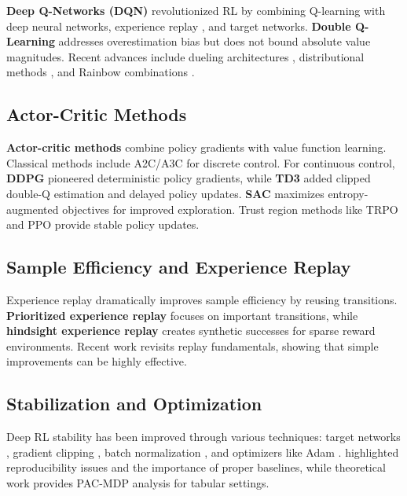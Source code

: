 \documentclass[11pt]{article}
\theoremstyle{definition}
\theoremstyle{remark}
\begin{document}
\textbf{Deep Q-Networks (DQN)} \citep{mnih2013playing, mnih2015human} revolutionized RL by combining Q-learning with deep neural networks, experience replay \citep{lin1992self}, and target networks. \textbf{Double Q-Learning} \citep{van2016deep} addresses overestimation bias but does not bound absolute value magnitudes. Recent advances include dueling architectures \citep{wang2016dueling}, distributional methods \citep{bellemare2017distributional, dabney2018implicit}, and Rainbow combinations \citep{hessel2018rainbow}.

\subsection{Actor-Critic Methods}

\textbf{Actor-critic methods} \citep{konda2000actor} combine policy gradients \citep{sutton2000policy} with value function learning. Classical methods include A2C/A3C \citep{mnih2016asynchronous} for discrete control. For continuous control, \textbf{DDPG} \citep{lillicrap2015continuous} pioneered deterministic policy gradients, while \textbf{TD3} \citep{fujimoto2018addressing} added clipped double-Q estimation and delayed policy updates. \textbf{SAC} \citep{haarnoja2018soft, haarnoja2018soft2} maximizes entropy-augmented objectives for improved exploration. Trust region methods like TRPO \citep{schulman2015trust} and PPO \citep{schulman2017proximal} provide stable policy updates.

\subsection{Sample Efficiency and Experience Replay}

Experience replay \citep{lin1992self} dramatically improves sample efficiency by reusing transitions. \textbf{Prioritized experience replay} \citep{schaul2015prioritized} focuses on important transitions, while \textbf{hindsight experience replay} \citep{andrychowicz2017hindsight} creates synthetic successes for sparse reward environments. Recent work \citep{fedus2020revisiting} revisits replay fundamentals, showing that simple improvements can be highly effective.

\subsection{Stabilization and Optimization}

Deep RL stability has been improved through various techniques: target networks \citep{mnih2015human}, gradient clipping \citep{pascanu2013difficulty}, batch normalization \citep{ioffe2015batch}, and optimizers like Adam \citep{kingma2014adam}. \citet{henderson2018deep} highlighted reproducibility issues and the importance of proper baselines, while theoretical work \citep{szepesvari2010algorithms} provides PAC-MDP analysis for tabular settings.
\end{document}
